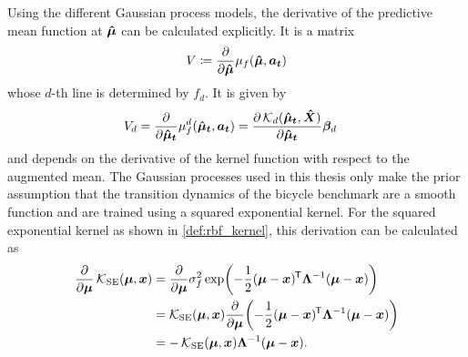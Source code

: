 Using the different Gaussian process models, the derivative of the predictive mean function at $\bm{\hat{\mu}}$ can be calculated explicitly.
It is a matrix
\begin{align}
    V \coloneqq \frac{\partial}{\partial \bm{\hat{\mu}}} \mu_f(\bm{\hat{\mu}}, \bm{a_t})
\end{align}
whose $d$-th line is determined by $f_d$.
It is given by
\begin{align}
    V_d &= \frac{\partial}{\partial \bm{\hat{\mu}_t}}\mu_f^d(\bm{\hat{\mu}_t}, \bm{a_t}) = \frac{\partial \operatorname{\mathcal{K}}_d(\bm{\hat{\mu}_t}, \bm{\hat{X}})}{\partial \bm{\hat{\mu}_t}}\bm{\beta}_d
\end{align}
and depends on the derivative of the kernel function with respect to the augmented mean.
The Gaussian processes used in this thesis only make the prior assumption that the transition dynamics of the bicycle benchmark are a smooth function and are trained using a squared exponential kernel.
For the squared exponential kernel as shown in \cref{def:rbf_kernel}, this derivation can be calculated as
\begin{align}
    \begin{split}
        \frac{\partial}{\partial \bm{\mu}}\operatorname{\mathcal{K}}_{\text{SE}}(\bm{\mu}, \bm{x}) &= \frac{\partial}{\partial \bm{\mu}} \sigma_f^2 \exp\!\left( -\frac{1}{2} (\bm{\mu} - \bm{x})^{\mkern-1.5mu\mathsf{T}} \bm{\Lambda}^{-1} (\bm{\mu} - \bm{x}) \right) \\
        &= \operatorname{\mathcal{K}}_{\text{SE}}(\bm{\mu}, \bm{x}) \frac{\partial}{\partial \bm{\mu}}\!\left( -\frac{1}{2} (\bm{\mu} - \bm{x})^{\mkern-1.5mu\mathsf{T}} \bm{\Lambda}^{-1} (\bm{\mu} - \bm{x}) \right) \\
        &= -\operatorname{\mathcal{K}}_{\text{SE}}(\bm{\mu}, \bm{x}) \bm{\Lambda}^{-1} (\bm{\mu} - \bm{x}).
    \end{split}
\end{align}

